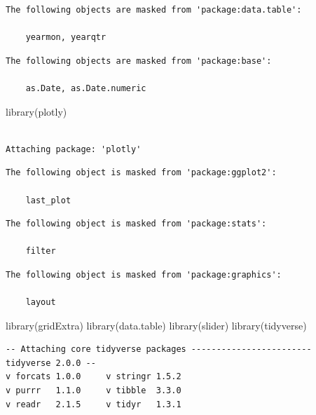 \documentclass[
  letterpaper,
  DIV=11,
  numbers=noendperiod]{scrartcl}
\newenvironment{Shaded}{\begin{snugshade}}{\end{snugshade}}
\newcommand{\FunctionTok}[1]{\textcolor[rgb]{0.28,0.35,0.67}{#1}}
\newcommand{\NormalTok}[1]{\textcolor[rgb]{0.00,0.23,0.31}{#1}}
\begin{document}
\begin{verbatim}
The following objects are masked from 'package:data.table':

    yearmon, yearqtr
\end{verbatim}

\begin{verbatim}
The following objects are masked from 'package:base':

    as.Date, as.Date.numeric
\end{verbatim}

\begin{Shaded}
\begin{Highlighting}[]
\FunctionTok{library}\NormalTok{(plotly)}
\end{Highlighting}
\end{Shaded}

\begin{verbatim}

Attaching package: 'plotly'
\end{verbatim}

\begin{verbatim}
The following object is masked from 'package:ggplot2':

    last_plot
\end{verbatim}

\begin{verbatim}
The following object is masked from 'package:stats':

    filter
\end{verbatim}

\begin{verbatim}
The following object is masked from 'package:graphics':

    layout
\end{verbatim}

\begin{Shaded}
\begin{Highlighting}[]
\FunctionTok{library}\NormalTok{(gridExtra)}
\FunctionTok{library}\NormalTok{(data.table)}
\FunctionTok{library}\NormalTok{(slider)}
\FunctionTok{library}\NormalTok{(tidyverse)}
\end{Highlighting}
\end{Shaded}

\begin{verbatim}
-- Attaching core tidyverse packages ------------------------ tidyverse 2.0.0 --
v forcats 1.0.0     v stringr 1.5.2
v purrr   1.1.0     v tibble  3.3.0
v readr   2.1.5     v tidyr   1.3.1
\end{verbatim}
\end{document}
